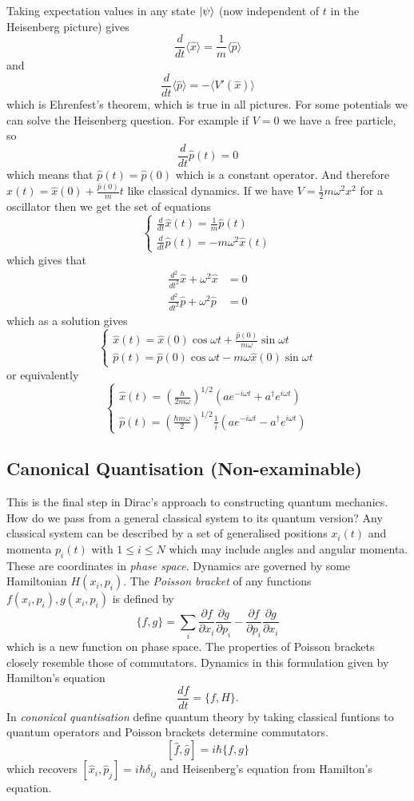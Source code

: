 \documentclass{article}
\begin{document}
Taking expectation values in any state $ \ket \psi $ (now independent of $ t $ in the Heisenberg picture) gives
\[
	\frac d{dt} \langle \hat x\rangle = \frac 1m \langle \hat p \rangle
\]
and
\[
	\frac d{dt} \langle \hat p\rangle = - \langle V'(\hat x)\rangle
\]
which is Ehrenfest's theorem, which is true in all pictures. For some potentials we can solve the Heisenberg question. For example if $ V=0 $ we have a free particle, so
\[
	\frac d{dt} \hat p(t) = 0
\]
which means that $ \hat p(t) = \hat p(0) $ which is a constant operator. And therefore $ \hat x(t) = \hat x(0) + \frac{\hat p(0)}m t $ like classical dynamics. If we have $ V = \frac 12 m\omega^2 x^2 $ for a oscillator then we get the set of equations
\[
  \begin{cases}
	  \frac d{dt} \hat x(t) = \frac 1m \hat p(t) \\
	  \frac d{dt} \hat p(t) = -m\omega^2 \hat x(t)
  \end{cases}
\]
which gives that
\begin{align*}
	\frac{d^2}{dt^2} \hat x + \omega^2 \hat x &= 0\\
	\frac{d^2}{dt^2} \hat p + \omega^2 \hat p &= 0
\end{align*}
which as a solution gives
\[
  \begin{cases}
	  \hat x(t) = \hat x(0) \cos\omega t + \frac{\hat p(0)}{m\omega} \sin\omega t \\
	  \hat p(t) = \hat p(0) \cos\omega t - m\omega \hat x(0) \sin\omega t
  \end{cases}
\]
or equivalently
\[
  \begin{cases}
	  \hat x(t) = \left(\frac\hbar{2m\omega}\right)^{1/2}(ae^{-i\omega t} + a^\dagger e^{i\omega t}) \\
	  \hat p(t) = \left(\frac{\hbar m\omega}2\right)^{1/2}\frac 1i (ae^{-i\omega t} - a^\dagger e^{i\omega t})
  \end{cases}
\]
\subsection{Canonical Quantisation (Non-examinable)}
This is the final step in Dirac's approach to constructing quantum mechanics. How do we pass from a general classical system to its quantum version? Any classical system can be described by a set of generalised positions $ x_i(t) $ and momenta $ p_i(t) $ with $ 1\le i \le N $ which may include angles and angular momenta. These are coordinates in \textit{phase space}. Dynamics are governed by some Hamiltonian $ H(x_i,p_i) $. The \textit{Poisson bracket} of any functions $ f(x_i,p_i), g(x_i,p_i) $ is defined by
\[
	\{ f,g\} = \sum_i \frac{\partial f}{\partial x_i} \frac{\partial g}{\partial p_i} - \frac{\partial f}{\partial p_i}\frac{\partial g}{\partial x_i}
\]
which is a new function on phase space. The properties of Poisson brackets closely resemble those of commutators. Dynamics in this formulation given by Hamilton's equation 
\[
	\frac {df}{dt} = \{ f, H\}.
\]
In \textit{cononical quantisation} define quantum theory by taking classical funtions to quantum operators and Poisson brackets determine commutators.
\[
	[\hat f,\hat g] = i\hbar \hat{\{f,g\}}
\]
which recovers $ [\hat x_i,\hat p_j] = i\hbar \delta_{ij} $ and Heisenberg's equation from Hamilton's equation.
\end{document}
